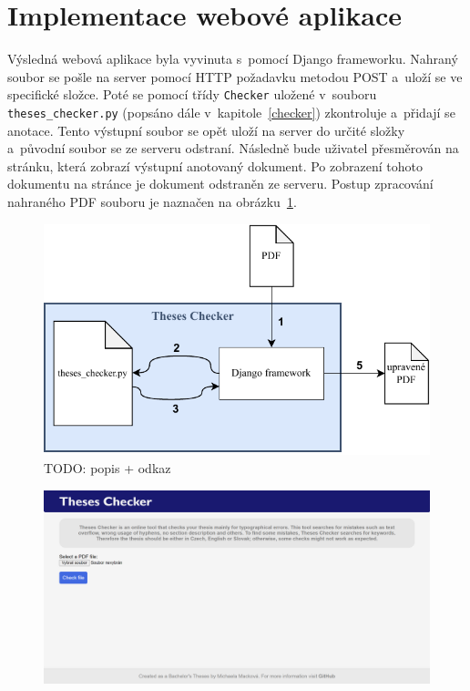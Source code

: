 \section{Implementace webové aplikace}
Výsledná webová aplikace byla vyvinuta s~pomocí Django frameworku.
Nahraný soubor se pošle na server pomocí HTTP požadavku metodou POST
a~uloží se ve specifické složce. Poté se pomocí třídy \texttt{Checker}
uložené v~souboru \texttt{theses\_checker.py} (popsáno dále
v~kapitole~\ref{checker}) zkontroluje a~přidají se anotace.
Tento výstupní soubor se opět uloží na server do určité složky a~původní soubor
se ze serveru odstraní. Následně bude uživatel přesměrován na stránku, která
zobrazí výstupní anotovaný dokument. Po zobrazení tohoto dokumentu na stránce je
dokument odstraněn ze serveru. Postup zpracování nahraného PDF souboru je
naznačen na obrázku~\ref{pic_communication}.

\begin{figure}[H]
    \label{pic_communication}
    \centering
    \includegraphics[width=0.8\linewidth]{obrazky-figures/Theses_Checker_communication.pdf}
    \caption{TODO: popis + odkaz}
\end{figure}

\begin{figure}[H]
    \label{pic_theses_checker_page1}
    \centering
    \includegraphics[width=\linewidth]{obrazky-figures/screenshot-page1.png}
    \caption{}
\end{figure}

